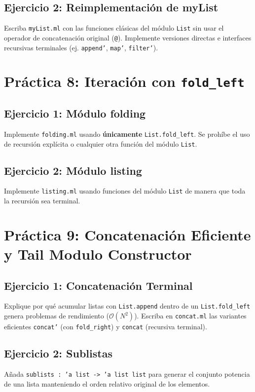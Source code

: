 \documentclass[11pt,a4paper]{article}
\begin{document}
\subsection{Ejercicio 2: Reimplementación de myList}
Escriba \texttt{myList.ml} con las funciones clásicas del módulo \texttt{List} sin usar el operador de concatenación original (\texttt{@}). Implemente versiones directas e interfaces recursivas terminales (ej. \texttt{append'}, \texttt{map'}, \texttt{filter'}).


\section{Práctica 8: Iteración con \texttt{fold\_left}}
\subsection{Ejercicio 1: Módulo folding}
Implemente \texttt{folding.ml} usando \textbf{únicamente} \texttt{List.fold\_left}. Se prohíbe el uso de recursión explícita o cualquier otra función del módulo \texttt{List}.

\subsection{Ejercicio 2: Módulo listing}
Implemente \texttt{listing.ml} usando funciones del módulo \texttt{List} de manera que toda la recursión sea terminal.


\section{Práctica 9: Concatenación Eficiente y Tail Modulo Constructor}
\subsection{Ejercicio 1: Concatenación Terminal}
Explique por qué acumular listas con \texttt{List.append} dentro de un \texttt{List.fold\_left} genera problemas de rendimiento ($\mathcal{O}(N^2)$). Escriba en \texttt{concat.ml} las variantes eficientes \texttt{concat'} (con \texttt{fold\_right}) y \texttt{concat} (recursiva terminal).

\subsection{Ejercicio 2: Sublistas}
Añada \texttt{sublists : 'a list -> 'a list list} para generar el conjunto potencia de una lista manteniendo el orden relativo original de los elementos.
\end{document}
